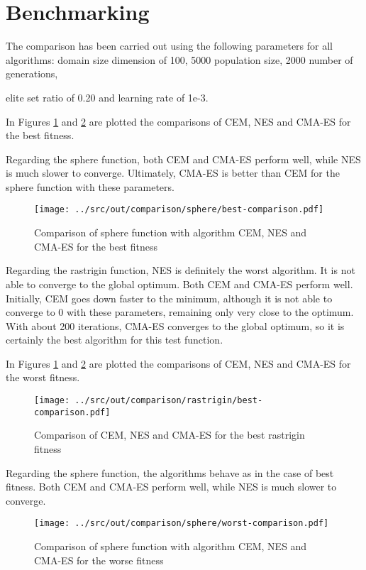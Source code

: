 \documentclass[a4paper,12pt]{article} %
\begin{document}
\section{Benchmarking}
The comparison has been carried out using the following parameters for all algorithms: 
{domain size dimension} of 100, 5000 {population size}, 2000 {number of generations}, {elite set ratio of 0.20 and  {learning rate} of 1e-3.
\bigskip 

In Figures \ref{fig:best-s} and \ref{fig:best-r} are plotted the comparisons of CEM, NES and CMA-ES for the best fitness. 
\bigskip 


Regarding the sphere function, both CEM and CMA-ES perform well, while NES is much slower to converge. 
Ultimately, CMA-ES is better than CEM for the sphere function with these parameters.

\begin{figure}[H]
	\centering
	\texttt{[image: ../src/out/comparison/sphere/best-comparison.pdf]}	
	\caption{Comparison of sphere function with algorithm CEM, NES and CMA-ES for the best fitness}
	\label{fig:best-s}
\end{figure}

Regarding the rastrigin function, NES is definitely the worst algorithm. It is not able to converge to the global optimum.
Both CEM and CMA-ES perform well.
Initially, CEM goes down faster to the minimum, although it is not able to converge to 0 with these parameters, remaining only very close to the optimum. 
With about 200 iterations, CMA-ES converges to the global optimum, so it is certainly the best algorithm for this test function.

\bigskip

In Figures \ref{fig:best-s} and \ref{fig:best-r} are plotted the comparisons of CEM, NES and CMA-ES for the worst fitness. 

\begin{figure}[H]
	\centering
	\texttt{[image: ../src/out/comparison/rastrigin/best-comparison.pdf]}	
	\caption{Comparison of CEM, NES and CMA-ES for the best rastrigin fitness}
	\label{fig:best-r}
\end{figure}

Regarding the sphere function, the algorithms behave as in the case of best fitness. Both CEM and CMA-ES perform well, while NES is much slower to converge. 

\begin{figure}[H]
	\centering
	\texttt{[image: ../src/out/comparison/sphere/worst-comparison.pdf]}	
	\caption{Comparison of sphere function with algorithm CEM, NES and CMA-ES for the worse fitness}
	\label{fig:worst-s}
\end{figure}


}
\end{document}
